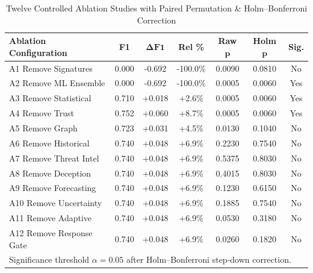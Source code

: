 \begin{table}[t]
\centering
\small
\caption{Twelve Controlled Ablation Studies with Paired Permutation \& Holm--Bonferroni Correction}
\label{tab:ablations}
\begin{tabular}{lcccccc}
\toprule
\textbf{Ablation Configuration} & \textbf{F1} & $\mathbf{\Delta F1}$ & \textbf{Rel \%} & \textbf{Raw }$\mathbf{p}$ & \textbf{Holm }$\mathbf{p}$ & \textbf{Sig.} \\
\midrule
A1 Remove Signatures & 0.000 & -0.692 & -100.0\% & 0.0090 & 0.0810 & No \\
A2 Remove ML Ensemble & 0.000 & -0.692 & -100.0\% & 0.0005 & 0.0060 & Yes \\
A3 Remove Statistical & 0.710 & +0.018 & +2.6\% & 0.0005 & 0.0060 & Yes \\
A4 Remove Trust & 0.752 & +0.060 & +8.7\% & 0.0005 & 0.0060 & Yes \\
A5 Remove Graph & 0.723 & +0.031 & +4.5\% & 0.0130 & 0.1040 & No \\
A6 Remove Historical & 0.740 & +0.048 & +6.9\% & 0.2230 & 0.7540 & No \\
A7 Remove Threat Intel & 0.740 & +0.048 & +6.9\% & 0.5375 & 0.8030 & No \\
A8 Remove Deception & 0.740 & +0.048 & +6.9\% & 0.4015 & 0.8030 & No \\
A9 Remove Forecasting & 0.740 & +0.048 & +6.9\% & 0.1230 & 0.6150 & No \\
A10 Remove Uncertainty & 0.740 & +0.048 & +6.9\% & 0.1885 & 0.7540 & No \\
A11 Remove Adaptive & 0.740 & +0.048 & +6.9\% & 0.0530 & 0.3180 & No \\
A12 Remove Response Gate & 0.740 & +0.048 & +6.9\% & 0.0260 & 0.1820 & No \\
\midrule
\multicolumn{7}{l}{\footnotesize Significance threshold $\alpha = 0.05$ after Holm--Bonferroni step-down correction.} \\
\bottomrule
\end{tabular}
\end{table}